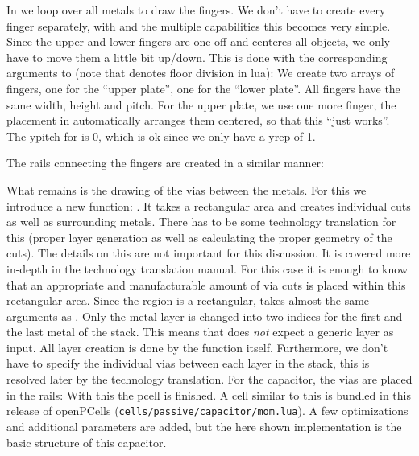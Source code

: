 In  we  loop over all metals to draw the fingers.
We don't have to create every finger separately, with  and the multiple capabilities this becomes very simple.
Since the upper and lower fingers are one-off and  centeres all objects, we only have to move them a little bit up/down.
This is done with the corresponding arguments to  (note that \luainline{//} denotes floor division in lua):
We create two arrays of fingers, one for the \enquote{upper plate}, one for the \enquote{lower plate}. All fingers have the same width, height and pitch. For the
upper plate, we use one more finger, the placement in  automatically arranges them centered, so that this \enquote{just works}.  The
ypitch for  is \num{0}, which is ok since we only have a yrep of \num{1}.

The rails connecting the fingers are created in a similar manner:

What remains is the drawing of the vias between the metals.
For this we introduce a new  function: .
It takes a rectangular area and creates individual cuts as well as surrounding metals.
There has to be some technology translation for this (proper layer generation as well as calculating the proper geometry of the cuts).
The details on this are not important for this discussion.
It is covered more in-depth in the technology translation manual.
For this case it is enough to know that an appropriate and manufacturable amount of via cuts is placed within this rectangular area.
Since the region is a rectangular,  takes almost the same arguments as .
Only the metal layer is changed into two indices for the first and the last metal of the stack.
This means that  does \emph{not} expect a generic layer as input.
All layer creation is done by the function itself.
Furthermore, we don't have to specify the individual vias between each layer in the stack, this is resolved later by the technology translation.
For the capacitor, the vias are placed in the rails:
With this the pcell is finished.
A cell similar to this is bundled in this release of openPCells (\texttt{cells/passive/capacitor/mom.lua}).
A few optimizations and additional parameters are added, but the here shown implementation is the basic structure of this capacitor.

